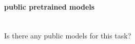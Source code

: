 \documentclass[runningheads]{llncs}
\begin{document}
\paragraph{public pretrained models}~\\

Is there any public models for this task?



%
%


%
\end{document}
